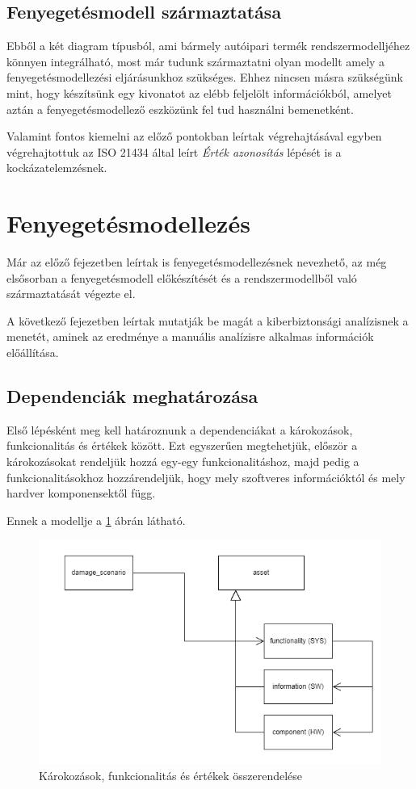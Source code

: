 \subsection{Fenyegetésmodell származtatása}

Ebből a két diagram típusból, ami bármely autóipari termék rendszermodelljéhez könnyen integrálható, most már tudunk származtatni olyan modellt amely a fenyegetésmodellezési eljárásunkhoz szükséges. Ehhez nincsen másra szükségünk mint, hogy készítsünk egy kivonatot az elébb feljelölt információkból, amelyet aztán a fenyegetésmodellező eszközünk fel tud használni bemenetként.

Valamint fontos kiemelni az előző pontokban leírtak végrehajtásával egyben végrehajtottuk az ISO 21434 által leírt \textit{Érték azonosítás} lépését is a kockázatelemzésnek.

\section{Fenyegetésmodellezés}

Már az előző fejezetben leírtak is fenyegetésmodellezésnek nevezhető, az még elsősorban a fenyegetésmodell előkészítését és a rendszermodellből való származtatását végezte el.

A következő fejezetben leírtak mutatják be magát a kiberbiztonsági analízisnek a menetét, aminek az eredménye a manuális analízisre alkalmas információk előállítása.

\subsection{Dependenciák meghatározása}

Első lépésként meg kell határoznunk a dependenciákat a károkozások, funkcionalitás és értékek között. Ezt egyszerűen megtehetjük, először a károkozásokat rendeljük hozzá egy-egy funkcionalitáshoz, majd pedig a funkcionalitásokhoz hozzárendeljük, hogy mely szoftveres információktól és mely hardver komponensektől függ.

Ennek a modellje a \ref{fig:04_dependencies} ábrán látható.

\begin{figure}[!ht]
	\centering
	\includegraphics[width=130mm, keepaspectratio]{figures/04_dependencies.png}
	\caption{Károkozások, funkcionalitás és értékek összerendelése}
	\label{fig:04_dependencies}
\end{figure}

